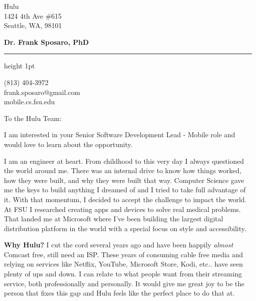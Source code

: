 \documentclass{letter} %
\begin{document}
\longindentation=0pt                       %
\let\raggedleft\raggedright                %

\begin{letter}{Hulu \\
1424 4th Ave \#615\\
Seattle, WA, 98101}

\begin{center}
{\large\bf Dr. Frank Sposaro, PhD} 
\end{center}
\medskip\hrule height 1pt
\begin{center}
{
(813) 404-3972 \\
frank.sposaro@gmail.com\\
mobile.cs.fsu.edu}
\end{center} \vfill %
 
 
\opening{To the Hulu Team:} 
 
\noindent I am interested in your Senior Software Development Lead - Mobile role and would love to learn about the opportunity.
 
\noindent I am an engineer at heart. From childhood to this very day I always questioned the world around me.
There was an internal drive to know how things worked, how they were built, and why they were built that way.
Computer Science gave me the keys to build anything I dreamed of and I tried to take full advantage of it.
With that momentum, I decided to accept the challenge to impact the world.
At FSU I researched creating apps and devices to solve real medical problems. 
That landed me at Microsoft where I've been building the largest digital distribution platform in the world with a special focus on style and accessibility.

\textbf{Why Hulu?} I cut the cord several years ago and have been happily \textit{almost} Comcast free, still need an ISP. These years of consuming
cable free media and relying on services like Netflix, YouTube, Microsoft Store, Kodi, etc.. have seen plenty of ups and down. I can relate
to what people want from their streaming service, both professionally and personally. It would give me great joy to be the person that fixes this gap and Hulu feels like the perfect place to do that at.


\end{letter}
\end{document}
